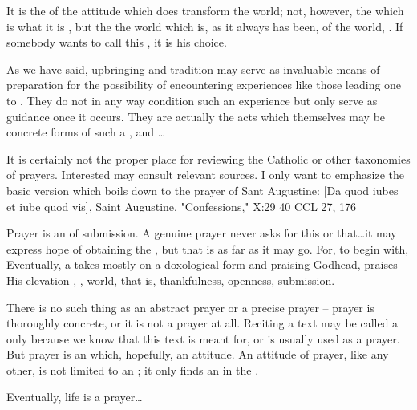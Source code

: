It is the  of the attitude which does transform the world;
not, however, the  which is what it is ,
but the the world which is, as it always has been, 
of the world, .  If somebody wants to call this
, it is his choice.


\newpage


\pa
As we have said, upbringing and tradition may serve as invaluable 
means of preparation for the possibility of encountering experiences 
like those leading one to \sch. They do not in any way condition such 
an experience but only serve as guidance once it occurs. They are 
actually the acts which themselves may be concrete forms of such a 
, and \ldots 

\pa
It is certainly not the proper place for reviewing the Catholic or
other taxonomies of prayers. Interested may consult relevant sources. 
I only want to emphasize the basic version which boils down to 
the prayer of Sant Augustine: 
 {[Da quod iubes et iube quod vis], Saint Augustine,
"Confessions," X:29 40 CCL 27, 176} 

\pa Prayer is an  of submission.  A genuine prayer never asks
for this or that\ldots it may express hope of obtaining the
, but that is as far as it may go. For,
to begin with, 
Eventually, a  takes mostly on a 
doxological form and praising Godhead, praises His  
elevation  , , world, that is, 
 thankfulness, openness, submission.

There is no such thing as an abstract prayer or a precise prayer --
prayer is thoroughly concrete, or it is not a prayer at all.  Reciting
a text may be called a  only because we know that this text
is meant for, or is usually used as a prayer.  But prayer is an
 which, hopefully,  an attitude.  An attitude of
prayer, like any other, is not limited to an ; it only finds
an  in the .

Eventually, life is a prayer\ldots


